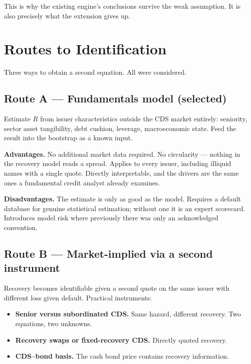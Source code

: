 \documentclass[11pt,a4paper]{article}
\begin{document}
This is why the existing engine's conclusions survive the weak assumption. It is also
precisely what the extension gives up.

\section{Routes to Identification}

Three ways to obtain a second equation. All were considered.

\subsection{Route A --- Fundamentals model (selected)}

Estimate $R$ from issuer characteristics outside the CDS market entirely: seniority,
sector asset tangibility, debt cushion, leverage, macroeconomic state. Feed the result
into the bootstrap as a known input.

\textbf{Advantages.} No additional market data required. No circularity --- nothing in
the recovery model reads a spread. Applies to every issuer, including illiquid names
with a single quote. Directly interpretable, and the drivers are the same ones a
fundamental credit analyst already examines.

\textbf{Disadvantages.} The estimate is only as good as the model. Requires a default
database for genuine statistical estimation; without one it is an expert scorecard.
Introduces model risk where previously there was only an acknowledged convention.

\subsection{Route B --- Market-implied via a second instrument}

Recovery becomes identifiable given a second quote on the same issuer with different
loss given default. Practical instruments:

\begin{itemize}[leftmargin=1.4em,itemsep=0.15em]
\item \textbf{Senior versus subordinated CDS.} Same hazard, different recovery. Two
equations, two unknowns.
\item \textbf{Recovery swaps or fixed-recovery CDS.} Directly quoted recovery.
\item \textbf{CDS--bond basis.} The cash bond price contains recovery information.
\end{itemize}
\end{document}

